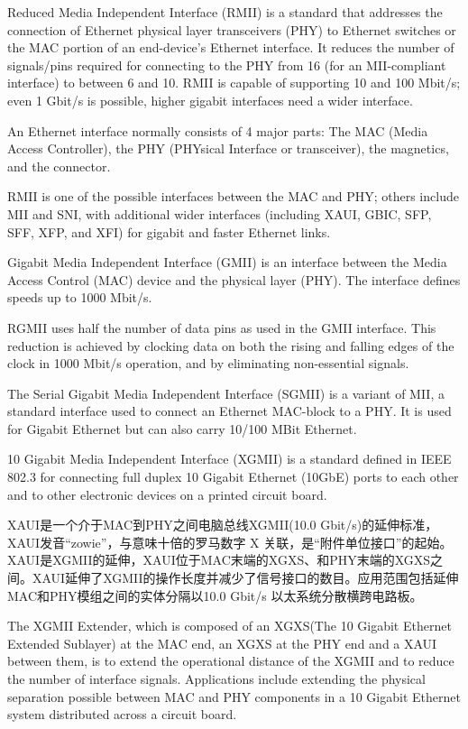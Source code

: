 Reduced Media Independent Interface (RMII) is a standard that addresses the connection of Ethernet physical layer transceivers (PHY) to Ethernet switches or the MAC portion of an end-device's Ethernet interface. It reduces the number of signals/pins required for connecting to the PHY from 16 (for an MII-compliant interface) to between 6 and 10. RMII is capable of supporting 10 and 100 Mbit/s; even 1 Gbit/s is possible, higher gigabit interfaces need a wider interface.

An Ethernet interface normally consists of 4 major parts: The MAC (Media Access Controller), the PHY (PHYsical Interface or transceiver), the magnetics, and the connector.

RMII is one of the possible interfaces between the MAC and PHY; others include MII and SNI, with additional wider interfaces (including XAUI, GBIC, SFP, SFF, XFP, and XFI) for gigabit and faster Ethernet links.

Gigabit Media Independent Interface (GMII) is an interface between the Media Access Control (MAC) device and the physical layer (PHY). The interface defines speeds up to 1000 Mbit/s.

RGMII uses half the number of data pins as used in the GMII interface. This reduction is achieved by clocking data on both the rising and falling edges of the clock in 1000 Mbit/s operation, and by eliminating non-essential signals.

The Serial Gigabit Media Independent Interface (SGMII) is a variant of MII, a standard interface used to connect an Ethernet MAC-block to a PHY. It is used for Gigabit Ethernet but can also carry 10/100 MBit Ethernet.

10 Gigabit Media Independent Interface (XGMII) is a standard defined in IEEE 802.3 for connecting full duplex 10 Gigabit Ethernet (10GbE) ports to each other and to other electronic devices on a printed circuit board.

XAUI是一个介于MAC到PHY之间电脑总线XGMII(10.0 Gbit/s)的延伸标准，XAUI发音``zowie''，与意味十倍的罗马数字 X 关联，是“附件单位接口”的起始。
XAUI是XGMII的延伸，XAUI位于MAC末端的XGXS、和PHY末端的XGXS之间。XAUI延伸了XGMII的操作长度并减少了信号接口的数目。应用范围包括延伸MAC和PHY模组之间的实体分隔以10.0 Gbit/s 以太系统分散横跨电路板。

The XGMII Extender, which is composed of an XGXS(The 10 Gigabit Ethernet Extended Sublayer) at the MAC end, an XGXS at the PHY end and a XAUI between them, is to extend the operational distance of the XGMII and to reduce the number of interface signals. Applications include extending the physical separation possible between MAC and PHY components in a 10 Gigabit Ethernet system distributed across a circuit board.


